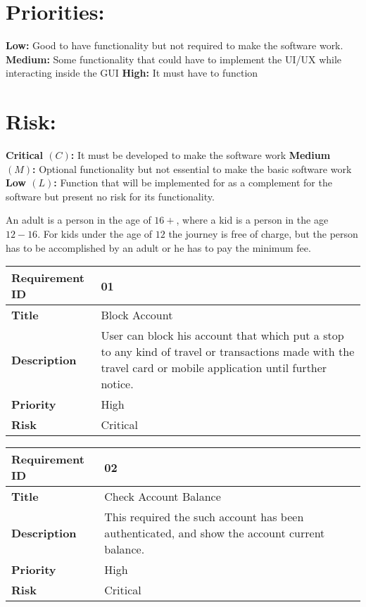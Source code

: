 \section*{Priorities:}
\textbf{Low:} Good to have functionality but not required to make the software work.
\textbf{Medium:} Some functionality that could have to implement the UI/UX while interacting inside the GUI
\textbf{High:} It must have to function

\section*{Risk:}
\textbf{Critical $(C)$:} It must be developed to make the software work
\textbf{Medium $(M)$:} Optional functionality but not essential to make the basic software work
\textbf{Low $(L)$:} Function that will be implemented for as a complement for the software but present no risk for its functionality. 

An adult is a person in the age of $16+$, where a kid is a person in the age $12 - 16$. For kids under the age of $12$ the journey is free of charge, but the person has to be accomplished by an adult or he has to pay the minimum fee.

\begin{center}
	\def\arraystretch{1.5}%
    \begin{tabular}{ | p{5cm} | p{5cm} |}
    \hline
    	\textbf{Requirement ID} & 01 \\ \hline
		\textbf{Title} & Block Account\\ \hline
		\textbf{Description} & User can block his account that which put a stop to any kind of travel or transactions made with the travel card or mobile application until further notice.\\ \hline
		\textbf{Priority} & High\\ \hline
		\textbf{Risk} & Critical\\
      \hline
    \end{tabular}
\end{center}

\begin{center}
	\def\arraystretch{1.5}%
    \begin{tabular}{ | p{5cm} | p{5cm} |}
    \hline
    	\textbf{Requirement ID} & 02 \\ \hline
		\textbf{Title} & Check Account Balance\\ \hline
		\textbf{Description} & This required the such account has been authenticated, and show the account current balance.\\ \hline
		\textbf{Priority} & High\\ \hline
		\textbf{Risk} & Critical\\
      \hline
    \end{tabular}
\end{center}

